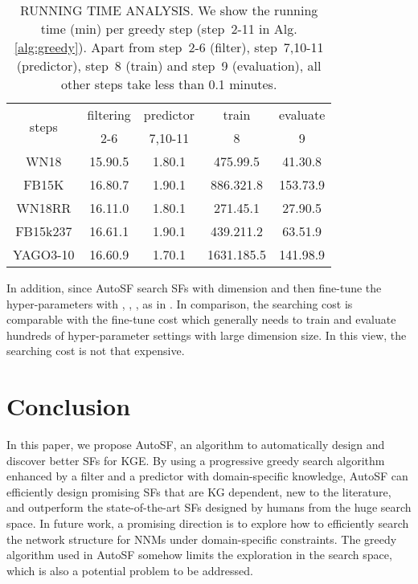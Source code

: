 \documentclass[conference]{IEEEtran}
\begin{document}
\begin{table}[ht]	
	\centering
	\vspace{-10px}
\caption{RUNNING TIME ANALYSIS. 
		We show the running time (min) per greedy step (step~2-11 in Alg.\ref{alg:greedy}).
		Apart from step~2-6 (filter), step~7,10-11 (predictor), step~8 (train)
		and step~9 (evaluation),
		all other steps take less than 0.1 minutes.}
	\vspace{-5px}
	\label{tab:stepcost}
	\renewcommand{\arraystretch}{1.1}
	\begin{tabular}{c | c | c | c | c}
		\hline
		\multirow{2}{*}{steps} & filtering & predictor & train           & evaluate \\ \cline{2-5}
		& 2-6       & 7,10-11   & 8               & 9        \\ \hline
		WN18          &  15.90.5   &   1.80.1  & 475.99.5  &  41.30.8    \\ \hline
		FB15K          &   16.80.7  &   1.90.1 & 886.321.8 &  153.73.9   \\ \hline
		WN18RR         &   16.11.0  &   1.80.1   & 271.45.1   & 27.90.5         \\ \hline
		FB15k237        &    16.61.1 &  1.90.1   & 439.211.2  &  63.51.9     \\ \hline
		YAGO3-10        &  16.60.9    &  1.70.1   & 1631.185.5 &  141.98.9        \\ \hline
	\end{tabular}
\label{tab:efficiency}
	\vspace{-3px}
\end{table}

In addition,
since AutoSF search SFs with dimension  and then fine-tune the hyper-parameters with , , ,  as in \cite{kazemi2018simple,lacroix2018canonical}.
In comparison, the searching cost is comparable with the fine-tune cost
which generally needs to train and evaluate hundreds of hyper-parameter settings with large dimension size.
In this view, the searching cost is not that expensive.






\section{Conclusion}
\label{sec:conclusion}
In this paper, we propose AutoSF, an algorithm to automatically design and discover better SFs for KGE.
By using a progressive greedy search algorithm enhanced by a filter and a predictor with domain-specific knowledge,
AutoSF can efficiently design promising SFs
that are KG dependent, new to the literature,
and outperform the state-of-the-art SFs designed by humans
from the huge search space.
{In future work,
a promising direction is to explore how to efficiently search the network structure for NNMs 
under domain-specific constraints.}
The greedy algorithm used in AutoSF somehow limits the exploration in the search space,
which is also a potential problem to be addressed.
\end{document}
